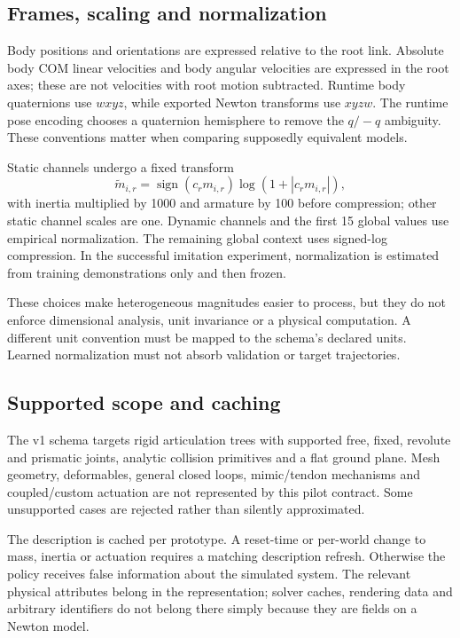 \documentclass[11pt,letterpaper]{article}
\begin{document}
\subsection{Frames, scaling and normalization}
Body positions and orientations are expressed relative to the root link.
Absolute body COM linear velocities and body angular velocities are expressed in
the root axes; these are not velocities with root motion subtracted. Runtime
body quaternions use $wxyz$, while exported Newton transforms use $xyzw$.
The runtime pose encoding chooses a quaternion hemisphere to remove the $q/-q$
ambiguity. These conventions matter when comparing supposedly equivalent models.

Static channels undergo a fixed transform
\begin{equation}
 \widetilde m_{i,r}=\operatorname{sign}(c_r m_{i,r})
                   \log\!\left(1+|c_r m_{i,r}|\right),
 \label{eq:compression}
\end{equation}
with inertia multiplied by 1000 and armature by 100 before compression; other
static channel scales are one. Dynamic channels and the first 15 global values
use empirical normalization. The remaining global context uses signed-log
compression. In the successful imitation experiment, normalization is estimated
from training demonstrations only and then frozen.

These choices make heterogeneous magnitudes easier to process, but they do not
enforce dimensional analysis, unit invariance or a physical computation. A
different unit convention must be mapped to the schema's declared units. Learned
normalization must not absorb validation or target trajectories.

\subsection{Supported scope and caching}
The v1 schema targets rigid articulation trees with supported free, fixed,
revolute and prismatic joints, analytic collision primitives and a flat ground
plane. Mesh geometry, deformables, general closed loops, mimic/tendon mechanisms
and coupled/custom actuation are not represented by this pilot contract. Some
unsupported cases are rejected rather than silently approximated.

The description is cached per prototype. A reset-time or per-world change to
mass, inertia or actuation requires a matching description refresh. Otherwise the
policy receives false information about the simulated system. The relevant
physical attributes belong in the representation; solver caches, rendering data
and arbitrary identifiers do not belong there simply because they are fields on
a Newton model.
\end{document}
